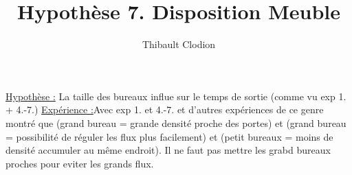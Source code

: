 \documentclass[12pt]{article}
\title{Hypothèse 7. Disposition Meuble}
\author{Thibault Clodion}
\begin{document}
\maketitle %

\underline{Hypothèse :} La taille des bureaux influe sur le temps de sortie (comme vu exp 1. +
4.-7.)
\newline\newline
\underline{Expérience :}Avec exp 1. et 4.-7. et d’autres expériences de ce genre montré que
(grand bureau = grande densité proche des portes) et (grand bureau
= possibilité de réguler les flux plus facilement) et (petit bureaux =
moins de densité accumuler au même endroit).
\newline
Il ne faut pas mettre les grabd bureaux proches pour eviter les grands flux.
\newline\newline
\end{document}
